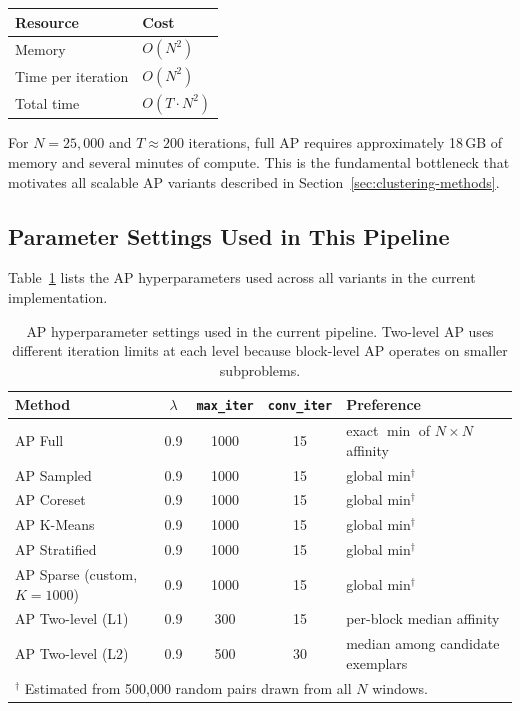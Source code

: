 \documentclass[11pt]{article}
\begin{document}
\begin{center}
\begin{tabular}{ll}
\toprule
Resource & Cost \\
\midrule
Memory & $O(N^2)$ \\
Time per iteration & $O(N^2)$ \\
Total time & $O(T \cdot N^2)$ \\
\bottomrule
\end{tabular}
\end{center}

For $N = 25{,}000$ and $T \approx 200$ iterations, full AP requires approximately 18\,GB of memory and several minutes of compute. This is the fundamental bottleneck that motivates all scalable AP variants described in Section~\ref{sec:clustering-methods}.

\subsection{Parameter Settings Used in This Pipeline}

Table~\ref{tab:ap-params} lists the AP hyperparameters used across all variants in the current implementation.

\begin{table}[h]
\centering
\caption{AP hyperparameter settings used in the current pipeline. Two-level AP uses different iteration limits at each level because block-level AP operates on smaller subproblems.}
\label{tab:ap-params}
\begin{tabular}{lcccp{4.2cm}}
\toprule
Method & $\lambda$ & \texttt{max\_iter} & \texttt{conv\_iter} & Preference \\
\midrule
AP Full            & 0.9 & 1000 & 15 & exact $\min$ of $N{\times}N$ affinity \\
AP Sampled         & 0.9 & 1000 & 15 & global min$^\dagger$ \\
AP Coreset         & 0.9 & 1000 & 15 & global min$^\dagger$ \\
AP K-Means         & 0.9 & 1000 & 15 & global min$^\dagger$ \\
AP Stratified      & 0.9 & 1000 & 15 & global min$^\dagger$ \\
AP Sparse (custom, $K=1000$) & 0.9 & 1000 & 15 & global min$^\dagger$ \\
AP Two-level (L1)  & 0.9 & 300  & 15 & per-block median affinity \\
AP Two-level (L2)  & 0.9 & 500  & 30 & median among candidate exemplars \\
\bottomrule
\multicolumn{5}{l}{$^\dagger$ Estimated from 500,000 random pairs drawn from all $N$ windows.}
\end{tabular}
\end{table}
\end{document}
